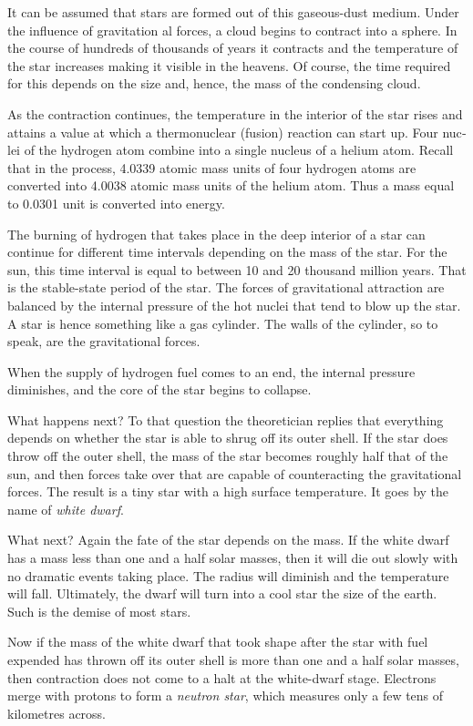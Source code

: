 It can be assumed that stars are formed out of this gaseous-dust medium. Under the influence of gravitation­ al forces, a cloud begins to contract into a sphere. In the course of hundreds of thousands of years it contracts and the temperature of the star increases making it visible in the heavens. Of course, the time required for this depends on the size and, hence, the mass of the con­densing cloud.

As the contraction continues, the temperature in the interior of the star rises and attains a value at which a thermonuclear (fusion) reaction can start up. Four nuc­lei of the hydrogen atom combine into a single nucleus of a helium atom. Recall that in the process, 4.0339 atomic mass units of four hydrogen atoms are converted into 4.0038 atomic mass units of the helium atom. Thus a mass equal to 0.0301 unit is converted into energy.

The burning of hydrogen that takes place in the deep interior of a star can continue for different time intervals depending on the mass of the star. For the sun, this time interval is equal to between 10 and 20 thousand million years. That is the stable-state period of the star. The forces of gravitational attraction are balanced by the internal pressure of the hot nuclei that tend to blow up the star. A star is hence something like a gas cylinder. The walls of the cylinder, so to speak, are the gravita­tional forces.

When the supply of hydrogen fuel comes to an end, the internal pressure diminishes, and the core of the star begins to collapse.

What happens next? To that question the theoretician replies that everything depends on whether the star is able to shrug off its outer shell. If the star does throw off the outer shell, the mass of the star becomes roughly half that of the sun, and then forces take over that are capable of counteracting the gravitational forces. The result is a tiny star with a high surface temperature. It goes by the name of \emph{white dwarf}.

What next? Again the fate of the star depends on the mass. If the white dwarf has a mass less than one and a half solar masses, then it will die out slowly with no dramatic events taking place. The radius will diminish and the temperature will fall. Ultimately, the dwarf will turn into a cool star the size of the earth. Such is the demise of most stars.

Now if the mass of the white dwarf that took shape after the star with fuel expended has thrown off its outer shell is more than one and a half solar masses, then contraction does not come to a halt at the white-dwarf stage. Electrons merge with protons to form a \emph{neutron star}, which measures only a few tens of kilometres across.

